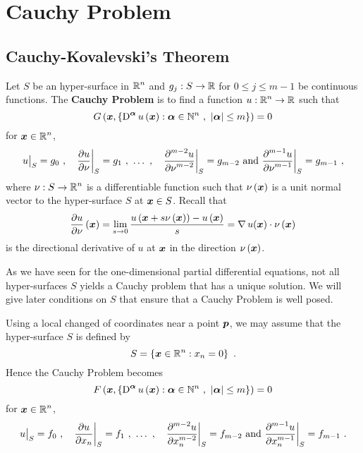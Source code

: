 \chapter{Cauchy Problem} \label{ChapterCauchyP}

\section{Cauchy-Kovalevski's Theorem}

Let $S$ be an hyper-surface in $\displaystyle \mathbb{R}^n$ and
$g_j:S\rightarrow \mathbb{R}$ for $0\leq j \leq m-1$ be continuous functions.
The {\bfseries Cauchy Problem} is to find a function
$\displaystyle u: \mathbb{R}^n \rightarrow \mathbb{R}$ such that
\begin{equation}\label{cp_GPDE}
G\left({\bm{x}},
\left\{ \operatorname{D}^{{\bm{\alpha}}} u\left({\bm{x}}\right) : {\bm{\alpha}} \in \mathbb{N}^n \ , \
  |{\bm{\alpha}}|\leq m \right\} \right) = 0
\end{equation}
for $\displaystyle {\bm{x}} \in \mathbb{R}^n$,
\begin{equation}\label{cp_GPDE_cond}
u\big|_S = g_0 \ , \quad \pdydx{u}{\nu}\bigg|_S = g_1 \ ,
\ \ldots\ ,\quad \pdydxn{u}{\nu}{m-2}\bigg|_S = g_{m-2} \ 
\text{and} \ \pdydxn{u}{\nu}{m-1}\bigg|_S = g_{m-1} \ ,
\end{equation}
where $\displaystyle \nu:S \rightarrow \mathbb{R}^n$ is a differentiable
function such that $\nu\left({\bm{x}}\right)$ is a unit normal vector
to the hyper-surface $S$ at ${\bm{x}} \in S$.  Recall that
\[
\frac{\partial{u}}{\partial \nu}\left({\bm{x}}\right) =
\lim_{s\rightarrow 0} \frac{u\left({\bm{x}}+s\nu\left({\bm{x}}\right)\right) -
u\left({\bm{x}}\right) }{s} = \operatorname{\nabla} u({\bm{x}}) \cdot \nu\left({\bm{x}}\right)
\]
is the directional derivative of $u$ at ${\bm{x}}$ in the direction
$\nu\left({\bm{x}}\right)$.

As we have seen for the one-dimensional partial differential
equations, not all hyper-surfaces $S$ yields a Cauchy problem that has a
unique solution.  We will give later conditions on $S$ that ensure that a
Cauchy Problem is well posed.

Using a local changed of coordinates near a point ${\bm{p}}$, we may
assume that the hyper-surface $S$ is defined by
\[
S = \left\{ {\bm{x}} \in \mathbb{R}^n : x_n = 0 \right\} \ .
\]
Hence the Cauchy Problem becomes
\begin{equation} \label{cauchy_GPDE}
F\left({\bm{x}},
\left\{ \operatorname{D}^{{\bm{\alpha}}} u\left({\bm{x}}\right) :
{\bm{\alpha}} \in \mathbb{N}^n \ , \  |{\bm{\alpha}}| \leq m \right\} \right) = 0
\end{equation}
for $\displaystyle {\bm{x}} \in \mathbb{R}^n$,
\[
u\big|_S = f_0 \ , \quad \pdydx{u}{x_n}\bigg|_S = f_1 \ , \ 
\ldots \ , \quad \pdydxn{u}{x_n}{m-2}\bigg|_S = f_{m-2} \ \text{and}
\ \pdydxn{u}{x_n}{m-1}\bigg|_S = f_{m-1} \ .
\]


